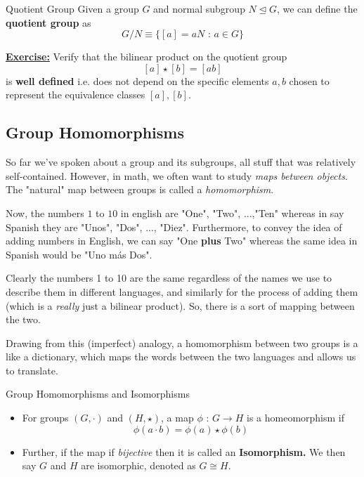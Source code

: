 \documentclass[11pt]{article}
\begin{document}
\vskip 0.5cm

\begin{mathdefinitionbox}{Quotient Group}
\vskip 0.5cm
  Given a group $G$ and normal subgroup $N \trianglelefteq G$, we can define the \textbf{quotient group} as 
  \[ G/N \equiv \{ [a] = aN \text{ : } a \in G \} \]
\end{mathdefinitionbox}

\vskip 0.5cm

\begin{dottedbox}
\underline{\textbf{Exercise:}} Verify that the bilinear product on the quotient group
\[ [a] \star [b] = [a b] \]
is \textbf{well defined} i.e. does not depend on the specific elements $a, b$ chosen to represent the equivalence classes $[a], [b]$.
\end{dottedbox}

\vskip 1cm
\subsection{Group Homomorphisms}
\vskip 0.5cm
So far we've spoken about a group and its subgroups, all stuff that was relatively self-contained. However, in math, we often want to study \emph{maps between objects}. The "natural" map between groups is called a \emph{homomorphism}.

\vskip 0.5cm
Now, the numbers $1$ to $10$ in english are "One", "Two", ...,"Ten" whereas in say Spanish they are "Unos", "Dos", ..., "Diez". Furthermore, to convey the idea of adding numbers in English, we can say "One \textbf{plus} Two" whereas the same idea in Spanish would be "Uno más Dos".

\vskip 0.5cm
Clearly the numbers 1 to 10 are the same regardless of the names we use to describe them in different languages, and similarly for the process of adding them (which is a \emph{really} just a bilinear product). So, there is a sort of mapping between the two.

\vskip 0.5cm
Drawing from this (imperfect) analogy, a homomorphism between two groups is a like a dictionary, which maps the words between the two languages and allows us to translate. 

\vskip 0.5cm
\begin{mathdefinitionbox}{Group Homomorphisms and Isomorphisms}
\vskip 0.5cm
\begin{itemize}
  \item For groups $(G, \cdot)$ and $(H, \star)$, a map $\phi \text{ : } G \rightarrow H$ is a homeomorphism if 
  \[ \phi(a \cdot b) = \phi(a) \star \phi(b) \]

  \item Further, if the map if \emph{bijective} then it is called an \textbf{Isomorphism.} We then say $G$ and $H$ are isomorphic, denoted as $G \cong H$.
\end{itemize}
\end{mathdefinitionbox}
\end{document}
